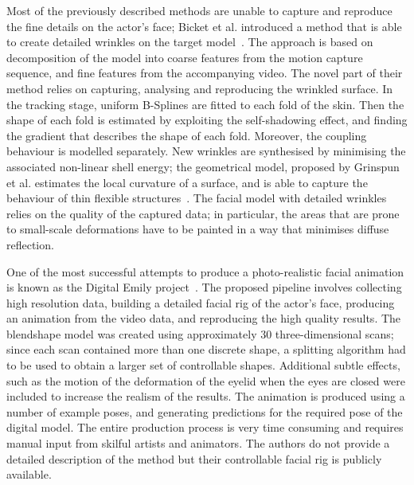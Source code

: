 Most of the previously described methods are unable to capture and reproduce the fine details on the actor's face; Bicket et al. introduced a method that is able to create detailed wrinkles on the target model~\cite{Bickel:2007}. The approach is based on decomposition of the model into coarse features from the motion capture sequence, and fine features from the accompanying video. The novel part of their method relies on capturing, analysing and reproducing the wrinkled surface. In the tracking stage, uniform B-Splines are fitted to each fold of the skin. Then the shape of each fold is estimated by exploiting the self-shadowing effect, and finding the gradient that describes the shape of each fold. Moreover, the coupling behaviour is modelled separately. New wrinkles are synthesised by minimising the associated non-linear shell energy; the geometrical model, proposed by Grinspun et al. estimates the local curvature of a surface, and is able to capture the behaviour of thin flexible structures~\cite{Grinspun:2003}. The facial model with detailed wrinkles relies on the quality of the captured data; in particular, the areas that are prone to small-scale deformations have to be painted in a way that minimises diffuse reflection.

One of the most successful attempts to produce a photo-realistic facial animation is known as the Digital Emily project~\cite{Alexander:2009}. The proposed pipeline involves collecting high resolution data, building a detailed facial rig of the actor's face, producing an animation from the video data, and reproducing the high quality results. The blendshape model was created using approximately $30$ three-dimensional scans; since each scan contained more than one discrete shape, a splitting algorithm had to be used to obtain a larger set of controllable shapes. Additional subtle effects, such as the motion of the deformation of the eyelid when the eyes are closed were included to increase the realism of the results. The animation is produced using a number of example poses, and generating predictions for the required pose of the digital model. The entire production process is very time consuming and requires manual input from skilful artists and animators. The authors do not provide a detailed description of the method but their controllable facial rig is publicly available.

